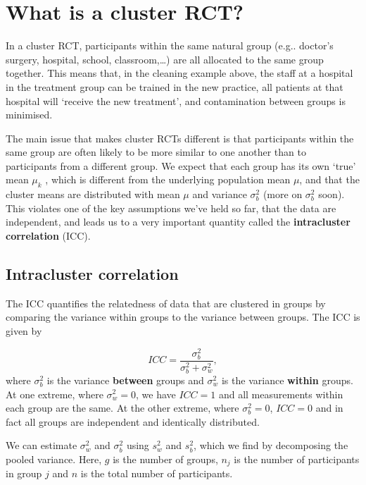 \documentclass[
  openany]{book}
\theoremstyle{definition}
\theoremstyle{definition}
\theoremstyle{definition}
\theoremstyle{definition}
\theoremstyle{remark}
\begin{document}
\section{What is a cluster RCT?}\label{what-is-a-cluster-rct}

In a cluster RCT, participants within the same natural group (e.g.. doctor's surgery, hospital, school, classroom,\ldots) are all allocated to the same group together. This means that, in the cleaning example above, the staff at a hospital in the treatment group can be trained in the new practice, all patients at that hospital will `receive the new treatment', and contamination between groups is minimised.

The main issue that makes cluster RCTs different is that participants within the same group are often likely to be more similar to one another than to participants from a different group. We expect that each group has its own `true' mean \(\mu_k\) , which is different from the underlying population mean \(\mu\), and that the cluster means are distributed with mean \(\mu\) and variance \(\sigma^2_b\) (more on \(\sigma^2_b\) soon). This violates one of the key assumptions we've held so far, that the data are independent, and leads us to a very important quantity called the \textbf{intracluster correlation} (ICC).

\subsection{Intracluster correlation}\label{intracluster-correlation}

The ICC quantifies the relatedness of data that are clustered in groups by comparing the variance within groups to the variance between groups. The ICC is given by

\[ICC = \frac{\sigma^2_b}{\sigma^2_b + \sigma^2_w}, \]
where \(\sigma^2_b\) is the variance \textbf{between} groups and \(\sigma^2_w\) is the variance \textbf{within} groups. At one extreme, where \(\sigma_w^2=0\), we have \(ICC=1\) and all measurements within each group are the same. At the other extreme, where \(\sigma^2_b=0\), \(ICC=0\) and in fact all groups are independent and identically distributed.

We can estimate \(\sigma_w^2\) and \(\sigma_b^2\) using \(s_w^2\) and \(s_b^2\), which we find by decomposing the pooled variance. Here, \(g\) is the number of groups, \(n_j\) is the number of participants in group \(j\) and \(n\) is the total number of participants.
\end{document}
